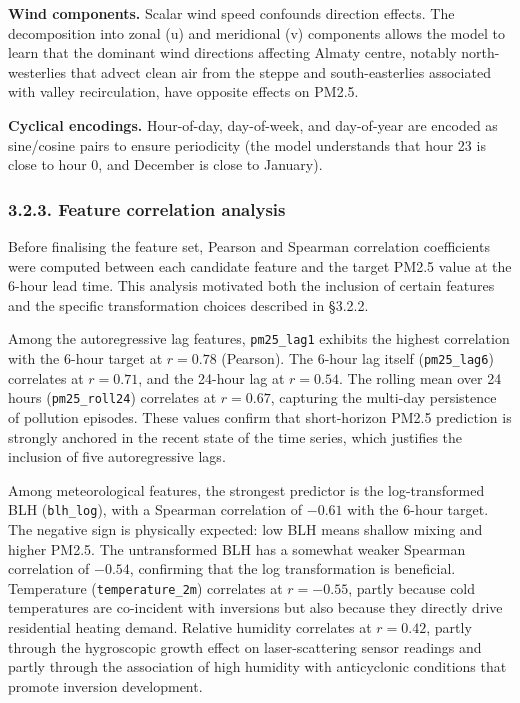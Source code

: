 \textbf{Wind components.} Scalar wind speed confounds direction effects. The decomposition into zonal (u) and meridional (v) components allows the model to learn that the dominant wind directions affecting Almaty centre, notably north-westerlies that advect clean air from the steppe and south-easterlies associated with valley recirculation, have opposite effects on PM2.5.

\textbf{Cyclical encodings.} Hour-of-day, day-of-week, and day-of-year are encoded as sine/cosine pairs to ensure periodicity (the model understands that hour 23 is close to hour 0, and December is close to January).

\subsubsection{3.2.3. Feature correlation analysis}\label{feature-correlation-analysis}

Before finalising the feature set, Pearson and Spearman correlation coefficients were computed between each candidate feature and the target PM2.5 value at the 6-hour lead time. This analysis motivated both the inclusion of certain features and the specific transformation choices described in §3.2.2.

Among the autoregressive lag features, \texttt{pm25\_lag1} exhibits the highest correlation with the 6-hour target at \(r = 0.78\) (Pearson). The 6-hour lag itself (\texttt{pm25\_lag6}) correlates at \(r = 0.71\), and the 24-hour lag at \(r = 0.54\). The rolling mean over 24 hours (\texttt{pm25\_roll24}) correlates at \(r = 0.67\), capturing the multi-day persistence of pollution episodes. These values confirm that short-horizon PM2.5 prediction is strongly anchored in the recent state of the time series, which justifies the inclusion of five autoregressive lags.

Among meteorological features, the strongest predictor is the log-transformed BLH (\texttt{blh\_log}), with a Spearman correlation of \(-0.61\) with the 6-hour target. The negative sign is physically expected: low BLH means shallow mixing and higher PM2.5. The untransformed BLH has a somewhat weaker Spearman correlation of \(-0.54\), confirming that the log transformation is beneficial. Temperature (\texttt{temperature\_2m}) correlates at \(r = -0.55\), partly because cold temperatures are co-incident with inversions but also because they directly drive residential heating demand. Relative humidity correlates at \(r = 0.42\), partly through the hygroscopic growth effect on laser-scattering sensor readings and partly through the association of high humidity with anticyclonic conditions that promote inversion development.

